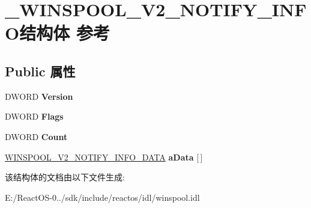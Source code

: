 \hypertarget{struct___w_i_n_s_p_o_o_l___v2___n_o_t_i_f_y___i_n_f_o}{}\section{\+\_\+\+W\+I\+N\+S\+P\+O\+O\+L\+\_\+\+V2\+\_\+\+N\+O\+T\+I\+F\+Y\+\_\+\+I\+N\+F\+O结构体 参考}
\label{struct___w_i_n_s_p_o_o_l___v2___n_o_t_i_f_y___i_n_f_o}
\subsection*{Public 属性}
\begin{DoxyCompactItemize}
\item 
\mbox{\label{struct___w_i_n_s_p_o_o_l___v2___n_o_t_i_f_y___i_n_f_o_a209d93ece1ffe639e8a2b528f9d62142}} 
D\+W\+O\+RD {\bfseries Version}
\item 
\mbox{\label{struct___w_i_n_s_p_o_o_l___v2___n_o_t_i_f_y___i_n_f_o_a593f47faa828473324e2418e7d0cc675}} 
D\+W\+O\+RD {\bfseries Flags}
\item 
\mbox{\label{struct___w_i_n_s_p_o_o_l___v2___n_o_t_i_f_y___i_n_f_o_a47c9c986bd1e9d4769d543d6832b862d}} 
D\+W\+O\+RD {\bfseries Count}
\item 
\mbox{\label{struct___w_i_n_s_p_o_o_l___v2___n_o_t_i_f_y___i_n_f_o_a4161be9614b30840ace638007c084e2e}} 
\hyperlink{struct___w_i_n_s_p_o_o_l___v2___n_o_t_i_f_y___i_n_f_o___d_a_t_a}{W\+I\+N\+S\+P\+O\+O\+L\+\_\+\+V2\+\_\+\+N\+O\+T\+I\+F\+Y\+\_\+\+I\+N\+F\+O\+\_\+\+D\+A\+TA} {\bfseries a\+Data} \mbox{[}$\,$\mbox{]}
\end{DoxyCompactItemize}


该结构体的文档由以下文件生成\+:\begin{DoxyCompactItemize}
\item 
E\+:/\+React\+O\+S-\/0../sdk/include/reactos/idl/winspool.\+idl\end{DoxyCompactItemize}
